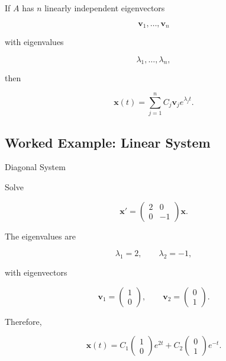 If \(A\) has \(n\) linearly independent eigenvectors

\[
\mathbf{v}_1,
\ldots,
\mathbf{v}_n
\]

with eigenvalues

\[
\lambda_1,
\ldots,
\lambda_n,
\]

then

\[
\boxed{
\mathbf{x}(t)
=
\sum_{j=1}^{n}
C_j
\mathbf{v}_j
e^{\lambda_jt}.
}
\]

\subsection{Worked Example: Linear System}
\label{subsec:worked-linear-system}

\begin{workedexamplebox}{Diagonal System}

Solve

\[
\mathbf{x}'
=
\begin{pmatrix}
2&0\\
0&-1
\end{pmatrix}
\mathbf{x}.
\]

The eigenvalues are

\[
\lambda_1=2,
\qquad
\lambda_2=-1,
\]

with eigenvectors

\[
\mathbf{v}_1
=
\begin{pmatrix}
1\\
0
\end{pmatrix},
\qquad
\mathbf{v}_2
=
\begin{pmatrix}
0\\
1
\end{pmatrix}.
\]

Therefore,

\begin{answerbox}
\[
\boxed{
\mathbf{x}(t)
=
C_1
\begin{pmatrix}
1\\
0
\end{pmatrix}
e^{2t}
+
C_2
\begin{pmatrix}
0\\
1
\end{pmatrix}
e^{-t}.
}
\]
\end{answerbox}

\end{workedexamplebox}

